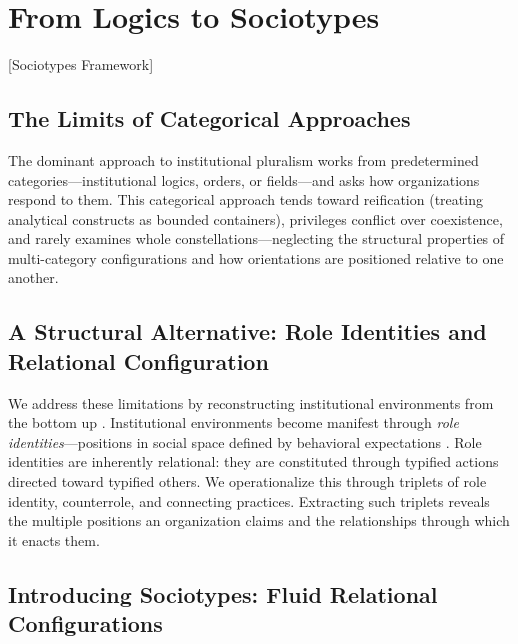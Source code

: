 \documentclass[../main.tex]{subfiles}
\begin{document}
\section{From Logics to Sociotypes}[Sociotypes Framework]

\subsection{The Limits of Categorical Approaches}

The dominant approach to institutional pluralism works from predetermined categories---institutional logics, orders, or fields---and asks how organizations respond to them. This categorical approach tends toward reification (treating analytical constructs as bounded containers), privileges conflict over coexistence, and rarely examines whole constellations---neglecting the structural properties of multi-category configurations and how orientations are positioned relative to one another.

\subsection{A Structural Alternative: Role Identities and Relational Configuration}

We address these limitations by reconstructing institutional environments from the bottom up \cite{jancsary2017structural}. Institutional environments become manifest through \textit{role identities}---positions in social space defined by behavioral expectations \cite{stryker1980symbolic}. Role identities are inherently relational: they are constituted through typified actions directed toward typified others. We operationalize this through triplets of role identity, counterrole, and connecting practices. Extracting such triplets reveals the multiple positions an organization claims and the relationships through which it enacts them.

\subsection{Introducing Sociotypes: Fluid Relational Configurations}
\end{document}
